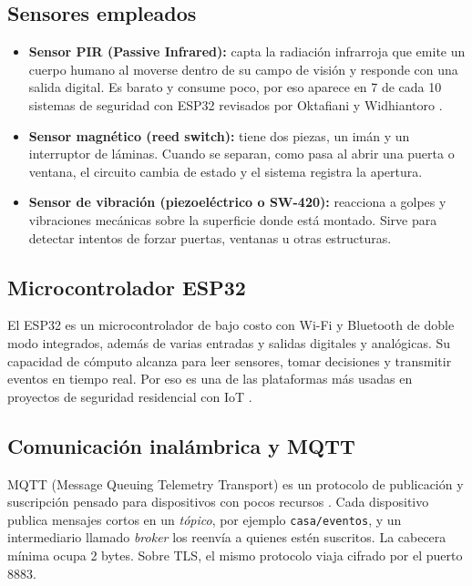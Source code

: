 \documentclass[conference]{IEEEtran}
\begin{document}
\subsection{Sensores empleados}
\begin{itemize}
  \item \textbf{Sensor PIR (Passive Infrared):} capta la radiación infrarroja que emite un cuerpo humano al moverse dentro de su campo de visión y responde con una salida digital. Es barato y consume poco, por eso aparece en 7 de cada 10 sistemas de seguridad con ESP32 revisados por Oktafiani y Widhiantoro \cite{oktafiani2025esp32}.
  \item \textbf{Sensor magnético (reed switch):} tiene dos piezas, un imán y un interruptor de láminas. Cuando se separan, como pasa al abrir una puerta o ventana, el circuito cambia de estado y el sistema registra la apertura.
  \item \textbf{Sensor de vibración (piezoeléctrico o SW-420):} reacciona a golpes y vibraciones mecánicas sobre la superficie donde está montado. Sirve para detectar intentos de forzar puertas, ventanas u otras estructuras.
\end{itemize}

\subsection{Microcontrolador ESP32}
El ESP32 es un microcontrolador de bajo costo con Wi-Fi y Bluetooth de doble modo integrados, además de varias entradas y salidas digitales y analógicas. Su capacidad de cómputo alcanza para leer sensores, tomar decisiones y transmitir eventos en tiempo real. Por eso es una de las plataformas más usadas en proyectos de seguridad residencial con IoT \cite{oktafiani2025esp32, nannung2025iot}.

\subsection{Comunicación inalámbrica y MQTT}
MQTT (Message Queuing Telemetry Transport) es un protocolo de publicación y suscripción pensado para dispositivos con pocos recursos \cite{alfuqaha2015survey, light2017mosquitto}. Cada dispositivo publica mensajes cortos en un \emph{tópico}, por ejemplo \texttt{casa/eventos}, y un intermediario llamado \emph{broker} los reenvía a quienes estén suscritos. La cabecera mínima ocupa 2 bytes. Sobre TLS, el mismo protocolo viaja cifrado por el puerto 8883.
\end{document}
